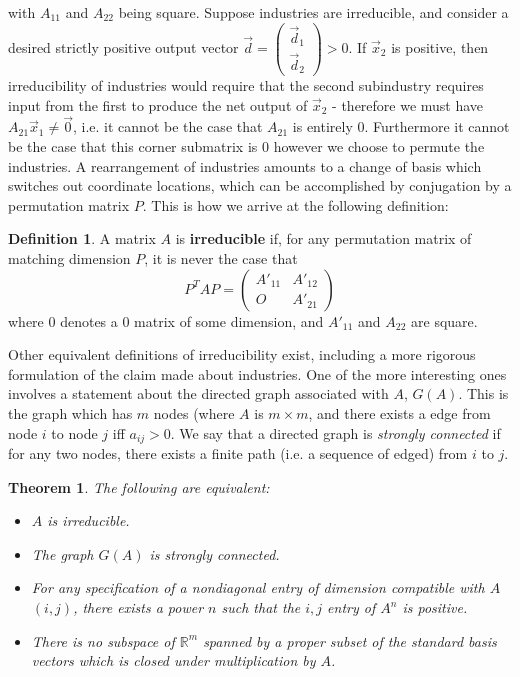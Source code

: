 \documentclass{article}
\theoremstyle{definition}
\newtheorem{definition}{Definition}[section]
\theoremstyle{plain}
\theoremstyle{theorem}
\newtheorem{theorem}{Theorem}[section]
\begin{document}
with $A_{11}$ and $A_{22}$ being square. Suppose industries are irreducible, and consider a desired strictly positive output vector $\vec{d} = \begin{pmatrix} \vec{d}_1 \\ \vec{d}_2 \end{pmatrix} > 0$.  If $\vec{x}_2$ is positive, then irreducibility of industries would require that the second subindustry requires input from the first to produce the net output of $\vec{x}_2$ - therefore we must have $A_{21}\vec{x}_1 \neq \vec{0}$, i.e. it cannot be the case that $A_{21}$ is entirely $0$. Furthermore it cannot be the case that this corner submatrix is $0$ however we choose to permute the industries. A rearrangement of industries amounts to a change of basis which switches out coordinate locations, which can be accomplished by conjugation by a permutation matrix $P$. This is how we arrive at the following definition:
\begin{definition}
	A matrix $A$ is \textbf{irreducible} if, for any permutation matrix of matching dimension $P$, it is never the case that
	\[ P^TAP = \begin{pmatrix} A'_{11} & A'_{12} \\ O & A'_{21} \end{pmatrix} \]
where $0$ denotes a $0$ matrix of some dimension, and $A'_{11}$ and $A_{22}$ are square. 
\end{definition}
Other equivalent definitions of irreducibility exist, including a more rigorous formulation of the claim made about industries. One of the more interesting ones involves a statement about the directed graph associated with $A$, $G(A)$. This is the graph which has $m$ nodes (where $A$ is $m\times m$, and there exists a edge from node $i$ to node $j$ iff $a_{ij} > 0$. We say that a directed graph is \emph{strongly connected} if for any two nodes, there exists a finite path (i.e. a sequence of edged) from $i$ to $j$.
\begin{theorem}
	The following are equivalent:
	\begin{itemize}
		\item[(i)] $A$ is irreducible.
		\item[(ii)] The graph $G(A)$ is strongly connected.
		\item[(iii)] For any specification of a nondiagonal entry of dimension compatible with $A$ $(i,j)$, there exists a power $n$ such that the $i,j$ entry of $A^n$ is positive.
		\item[(iv)] There is no subspace of $\mathbb{R}^m$ spanned by a proper subset of the standard basis vectors which is closed under multiplication by $A$.  
	\end{itemize} 
\end{theorem}
\end{document}
